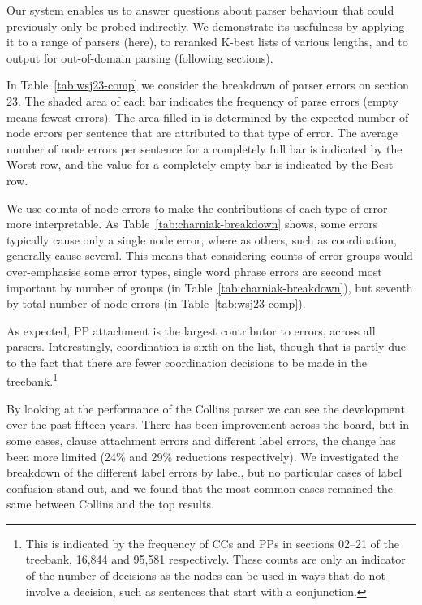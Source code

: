 Our system enables us to answer questions about parser behaviour that could previously only be probed indirectly.
We demonstrate its usefulness by applying it to a range of parsers (here), to reranked K-best lists of various lengths, and to output for out-of-domain parsing (following sections).

\begin{landscape}

\end{landscape}

In Table~\ref{tab:wsj23-comp} we consider the breakdown of parser errors on \wsj section 23.
The shaded area of each bar indicates the frequency of parse errors (\myie empty means fewest errors).
The area filled in is determined by the expected number of node errors per sentence that are attributed to that type of error.
The average number of node errors per sentence for a completely full bar is indicated by the Worst row, and the value for a completely empty bar is indicated by the Best row.

We use counts of node errors to make the contributions of each type of error more interpretable.
As Table~\ref{tab:charniak-breakdown} shows, some errors typically cause only a single node error, where as others, such as coordination, generally cause several.
This means that considering counts of error groups would over-emphasise some error types, \myeg single word phrase errors are second most important by number of groups (in Table~\ref{tab:charniak-breakdown}), but seventh by total number of node errors (in Table~\ref{tab:wsj23-comp}).

As expected, PP attachment is the largest contributor to errors, across all parsers.
Interestingly, coordination is sixth on the list, though that is partly due to the fact that there are fewer coordination decisions to be made in the treebank.\footnote{This is indicated by the frequency of CCs and PPs in sections 02--21 of the treebank, 16,844 and 95,581 respectively.
These counts are only an indicator of the number of decisions as the nodes can be used in ways that do not involve a decision, such as sentences that start with a conjunction.}

By looking at the performance of the Collins parser we can see the development
over the past fifteen years.  There has been improvement across
the board, but in some cases, \myeg clause attachment errors and different label
errors, the change has been more limited (24\% and 29\% reductions respectively).  We
investigated the breakdown of the different label errors by label, but no
particular cases of label confusion stand out, and we found that the most
common cases remained the same between Collins and the top results.

